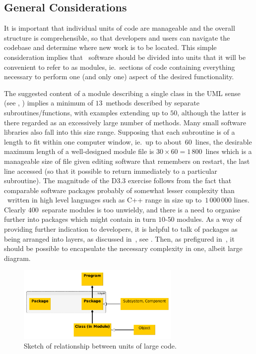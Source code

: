 \subsection{General Considerations}\label{sec:TS_considers}
It is important that individual units of code are manageable and the overall
structure is comprehensible, so that developers and users can navigate the codebase
and determine where new work is to be located.  This simple consideration implies
that \nep\ software should be divided into units that it will be convenient to refer
to as modules, ie.\ sections of code containing everything necessary to perform one
(and only one) aspect of the desired functionality.

The suggested content of a module
describing a single class in the UML sense (see , )
implies a minimum of $13$~methods described by separate subroutines/functions,
with examples extending up to $50$, although the latter is there regarded as an excessively large
number of methods.
Many small software libraries also fall into this size range.
Supposing that each subroutine is of a length to fit within one computer window, ie.\
up to about~$60$~lines, the desirable maximum length of a well-designed module file is
$30\times60 = 1\,800$~lines which is a manageable size of file given 
editing software that remembers on restart, the last line accessed (so that it possible
to return immediately to a particular subroutine).
The magnitude of the D3.3 exercise follows from
the fact that comparable software packages probably of somewhat lesser complexity
than \nep\ written in high level languages such as C++ range in size up to~$1\,000\,000$ lines.
Clearly $400$~separate modules is too unwieldy, and there is a need to organise
further into packages which might contain in turn $10$-$50$ modules. 
As a way of providing further indication to developers,
it is helpful to talk of packages as being arranged into layers, as discussed
in~\cite[\S\S\,2.4,3.2]{y2re333}, see \Fig{hierarchygroup}.
Then, as prefigured in~\cite[Annex~A]{y2re333}, it should be  possible to encapsulate
the necessary complexity in one, albeit large diagram.
\begin{figure}
\centerline{\includegraphics[width=0.7\textwidth]{./png/hierarchygroup.png}}
\caption{
Sketch of relationship between units of large code.
\label{fig:hierarchygroup}}
\end{figure}

